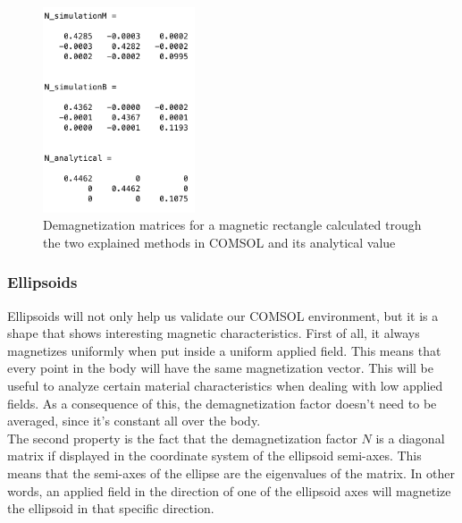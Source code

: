 \begin{figure}[ht]
	\centering
  \includegraphics[width=0.4\textwidth]{Pictures/N_rectangle.png}
	\caption{Demagnetization matrices for a magnetic rectangle calculated trough the two explained methods in COMSOL and its analytical value}
	\label{fig:N_rectangle}
\end{figure}

\subsubsection{Ellipsoids}

Ellipsoids will not only help us validate our COMSOL environment, but it is a shape that shows interesting magnetic characteristics. First of all, it always magnetizes uniformly when put inside a uniform applied field. This means that every point in the body will have the same magnetization vector. This will be useful to analyze certain material characteristics when dealing with low applied fields. As a consequence of this, the demagnetization factor doesn't need to be averaged, since it's constant all over the body. \\

The second property is the fact that the demagnetization factor $N$ is a diagonal matrix if displayed in the coordinate system of the ellipsoid semi-axes. This means that the semi-axes of the ellipse are the eigenvalues of the matrix. In other words, an applied field in the direction of one of the ellipsoid axes will magnetize the ellipsoid in that specific direction.\\

